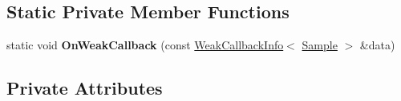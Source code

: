 \subsection*{Static Private Member Functions}
\begin{DoxyCompactItemize}
\item 
static void {\bfseries On\+Weak\+Callback} (const \hyperlink{classv8_1_1_weak_callback_info}{Weak\+Callback\+Info}$<$ \hyperlink{structv8_1_1internal_1_1_sampling_heap_profiler_1_1_sample}{Sample} $>$ \&data)\hypertarget{classv8_1_1internal_1_1_sampling_heap_profiler_a9a961ec27db6a3cb849ce85469ec02c5}{}\label{classv8_1_1internal_1_1_sampling_heap_profiler_a9a961ec27db6a3cb849ce85469ec02c5}

\end{DoxyCompactItemize}
\subsection*{Private Attributes}
